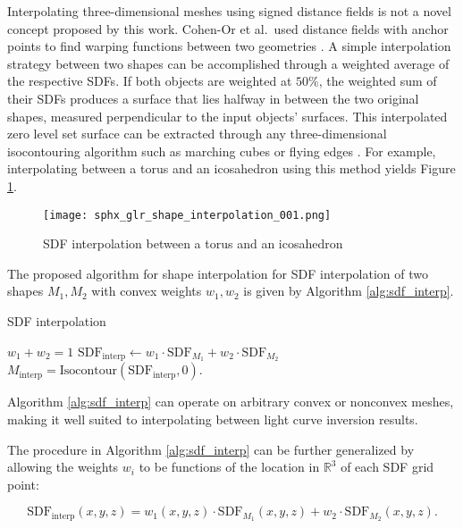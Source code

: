 Interpolating three-dimensional meshes using signed distance fields is not a novel concept proposed by this work. Cohen-Or et al.\ used distance fields with anchor points to find warping functions between two geometries \cite{cohen_or1998}. A simple interpolation strategy between two shapes can be accomplished through a weighted average of the respective SDFs. If both objects are weighted at $50\%$, the weighted sum of their SDFs produces a surface that lies halfway in between the two original shapes, measured perpendicular to the input objects' surfaces. This interpolated zero level set surface can be extracted through any three-dimensional isocontouring algorithm such as marching cubes \cite{lorensen1987} or flying edges \cite{schroeder2015}. For example, interpolating between a torus and an icosahedron using this method yields Figure \ref{fig:interpolating_torus_ico}. 

\begin{figure}[!htb]
  \centering
  \texttt{[image: sphx\_glr\_shape\_interpolation\_001.png]}
  \caption{SDF interpolation between a torus and an icosahedron}
  \label{fig:interpolating_torus_ico}
\end{figure}

The proposed algorithm for shape interpolation for SDF interpolation of two shapes $M_1, M_2$ with convex weights $w_1, w_2$ is given by Algorithm \ref{alg:sdf_interp}.

\begin{algorithm}
  \caption{SDF interpolation}\label{alg:sdf_interp}
  \begin{algorithmic}
  \Require $w_1 + w_2 = 1$
  \State $\mathrm{SDF}_{\textrm{interp}} \gets w_1 \cdot \mathrm{SDF}_{M_1} + w_2 \cdot \mathrm{SDF}_{M_2}$
  \State $M_{\textrm{interp}} = \mathrm{Isocontour}(\mathrm{SDF}_{\textrm{interp}}, 0)$.
  \end{algorithmic}
\end{algorithm}

Algorithm \ref{alg:sdf_interp} can operate on arbitrary convex or nonconvex meshes, making it well suited to interpolating between light curve inversion results.

The procedure in Algorithm \ref{alg:sdf_interp} can be further generalized by allowing the weights $w_i$ to be functions of the location in $\mathbb{R}^3$ of each SDF grid point:

\begin{equation}
  \mathrm{SDF}_{\mathrm{interp}}(x, y, z) = w_1(x, y, z) \cdot \mathrm{SDF}_{M_1}(x, y, z) + w_2 \cdot \mathrm{SDF}_{M_2}(x, y, z).
\end{equation}

